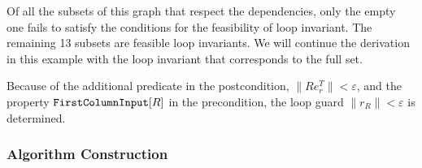 %
%
%
%		
%
%
%
%
%
Of all the subsets of this graph that respect the dependencies, only the empty one fails to satisfy the conditions for the feasibility of loop invariant. The remaining 13 subsets are feasible loop invariants. We will continue the derivation in this example with the loop invariant that corresponds to the full set.
%

Because of the additional predicate in the postcondition, $\| R e_r^T \| < \varepsilon$, and the property $\text{\ttfamily FirstColumnInput}[R]$ in the precondition, the loop guard $\| r_R \| < \varepsilon$ is determined.

\subsubsection{Algorithm Construction}

